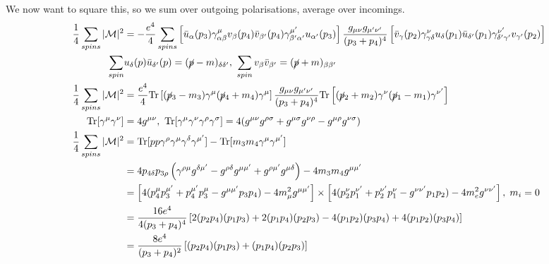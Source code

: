\documentclass[a4paper, 11pt, normalem]{report}
\begin{document}
We now want to square this, so we sum over outgoing polarisations, average over incomings.
\begin{align}
    \frac14\sum_{spins}|\mathcal{M}|^2 &= -\frac{e^4}{4}\sum_{spins}\left[\bar{u}_\alpha(p_3)\gamma_{\alpha\beta}^\mu v_\beta(p_4)\bar{v}_{\beta'}(p_4)\gamma_{\beta'\alpha'}^{\mu'}u_{\alpha'}(p_3)\right]\frac{g_{\mu\nu}g_{\mu'\nu'}}{(p_3+p_4)^4}\left[\bar{v}_\gamma(p_2)\gamma^\nu_{\gamma\delta}u_\delta(p_1)\bar{u}_{\delta'}(p_1)\gamma^{\nu'}_{\delta'\gamma'}v_{\gamma'}(p_2)\right] \\
    \sum_{spin} &u_{\delta}(p)\bar{u}_{\delta'}(p) = (\cancel{p}-m)_{\delta\delta'},~ \sum_{spin} v_\beta\bar{v}_{\beta'} = (\cancel{p}+m)_{\beta\beta'} \\
    \frac14\sum_{spins}|\mathcal{M}|^2 &= \frac{e^4}{4}\text{Tr}\left[(\cancel{p}_3-m_3)\gamma^\mu(\cancel{p}_4+m_4)\gamma^\mu\right]\frac{g_{\mu\nu}g_{\mu'\nu'}}{(p_3+p_4)^4}\text{Tr}\left[(\cancel{p}_2+m_2)\gamma^\nu(\cancel{p}_1-m_1)\gamma^{\nu'}\right] \\
    \text{Tr}[\gamma^\mu\gamma^\nu] &= 4g^{\mu\nu},~ \text{Tr}[\gamma^\mu\gamma^\nu\gamma^\rho\gamma^\sigma] = 4(g^{\mu\nu}g^{\rho\sigma}+g^{\mu\sigma}g^{\nu\rho}-g^{\mu\rho}g^{\nu\sigma}) \\
    \frac14\sum_{spins}|\mathcal{M}|^2&=\text{Tr}[pp\gamma^\rho\gamma^\mu\gamma^\delta\gamma^{\mu'}]-\text{Tr}[m_3m_4\gamma^\mu\gamma^{\mu'}] \\
                                      &= 4p_{4\delta}p_{3\rho}\left(\gamma^{\rho\mu}g^{\delta\mu'}-g^{\rho\delta}g^{\mu\mu'}+g^{\rho\mu'}g^{\mu\delta}\right) - 4m_3m_4g^{\mu\mu'} \\
                                      &= \left[4(p_4^\mu p_3^{\mu'}+ p_4^{\mu'}p_3^\mu - g^{\mu\mu'}p_3p_4)-4m_\mu^2g^{\mu\mu'}\right]\times\left[4(p_2^\nu p_1^{\nu'}+p_2^{\nu'}p_1^\nu - g^{\nu\nu'}p_1p_2)-4m_e^2g^{\nu\nu'}\right],\; m_i = 0 \\
                                      &= \frac{16e^4}{4(p_3+p_4)^4}\left[2(p_2p_4)(p_1p_3) + 2(p_1p_4)(p_2p_3) - 4(p_1p_2)(p_3p_4) + 4(p_1p_2)(p_3p_4)\right] \\
                                      &= \frac{8e^4}{(p_3+p_4)^2}\left[(p_2p_4)(p_1p_3)+(p_1p_4)(p_2p_3)\right]
\end{align}

%
%
\end{document}
